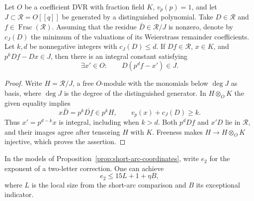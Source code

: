 \begin{auxlemma}\label{lem:short-arc-content}
Let \(O\) be a coefficient DVR with fraction field \(K\),
\(v_p(p)=1\), and let \(J\subset\mathcal R=O[[q]]\) be generated by
a distinguished polynomial. Take \(D\in\mathcal R\) and
\(f\in\operatorname{Frac}(\mathcal R)\). Assuming that the residue
\(\bar D\in\mathcal R/J\) is nonzero, denote by \(c_J(D)\) the minimum of the
valuations of its Weierstrass remainder coefficients. Let \(k,d\)
be nonnegative integers with \(c_J(D)\le d\). If
\(Df\in\mathcal R\), \(x\in K\), and \(p^k Df-Dx\in J\), then there is an integral constant satisfying
\[
 \exists x'\in O:\qquad D(p^d f-x')\in J.
\]
\end{auxlemma}
\begin{proof}
Write \(H=\mathcal R/J\), a free \(O\)-module with the monomials
below \(\deg J\) as basis, where \(\deg J\) is the degree of the
distinguished generator. In \(H\otimes_O K\) the given equality
implies
\[
 x\bar D=p^k\overline{Df}\in p^k H,\qquad
 v_p(x)+c_J(D)\ge k .
\]
Thus \(x'=p^{d-k}x\) is integral, including when \(k>d\).
Both \(p^d Df\) and \(x'D\) lie in \(\mathcal R\), and their
images agree after tensoring \(H\) with \(K\). Freeness makes
\(H\to H\otimes_O K\) injective, which proves the assertion.
\end{proof}

\begin{lemma}\label{lem:two-letter-wach-lift}
In the models of Proposition~\ref{prop:short-arc-coordinates},
write \(e_2\) for the exponent of a two-letter correction. One can achieve
\[
 e_2\le15L+1+\eta B,
\]
where \(L\) is the local size from the short-arc comparison and \(B\) its
exceptional indicator.
\end{lemma}

